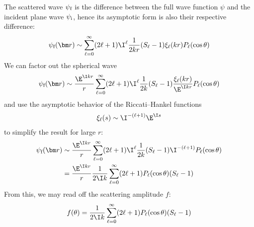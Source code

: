 \documentclass[fleqn, 12pt]{article}
\begin{document}
\begin{enumerate}
  The scattered wave $\psi_{\text f}$ is the difference between the full wave
  function $\psi$ and the incident plane wave $\psi_{\text i}$, hence its
  asymptotic form is also their respective difference:
  \begin{align*}
    \psi_{\text f}(\bm r) \sim \sum_{\ell = 0}^\infty (2 \ell + 1) \I^\ell
    \frac{1}{2 k r} (S_\ell - 1) \xi_\ell(k r) P_\ell(\cos \theta)
  \end{align*}
  We can factor out the spherical wave
  \begin{align*}
    \psi_{\text f}(\bm r) \sim \frac{\E^{\I k r}}{r}
    \sum_{\ell = 0}^\infty (2 \ell + 1) \I^\ell
    \frac{1}{2 k} (S_\ell - 1) \frac{\xi_\ell(k r)}{\E^{\I k r}} P_\ell(\cos \theta)
  \end{align*}
  and use the asymptotic behavior of the Riccati--Hankel functions
  \begin{align*}
    \xi_\ell(s) \sim \I^{-(\ell + 1)} \E^{\I s}
  \end{align*}
  to simplify the result for large $r$:
  \begin{align*}
    \psi_{\text f}(\bm r)
    &\sim \frac{\E^{\I k r}}{r}
    \sum_{\ell = 0}^\infty (2 \ell + 1) \I^\ell
    \frac{1}{2 k} (S_\ell - 1) \I^{-(\ell + 1)} P_\ell(\cos \theta) \\
    &=\frac{\E^{\I k r}}{r}
    \frac{1}{2 \I k} \sum_{\ell = 0}^\infty (2 \ell + 1)
    P_\ell(\cos \theta) (S_\ell - 1)
  \end{align*}
  From this, we may read off the scattering amplitude $f$:
  \begin{align*}
    f(\theta) =
    \frac{1}{2 \I k} \sum_{\ell = 0}^\infty (2 \ell + 1)
    P_\ell(\cos \theta) (S_\ell - 1)
  \end{align*}


\end{enumerate}
\end{document}
